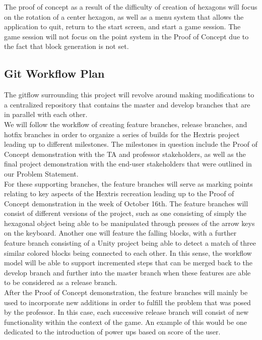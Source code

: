 \documentclass[12pt]{article}
\begin{document}
The proof of concept as a result of the difficulty of creation of hexagons will focus on the rotation of a center hexagon, as well as a menu system that allows the application to quit, return to the start screen, and start a game session. The game session will not focus on the point system in the Proof of Concept due to the fact that block generation is not set. 

\subsection{Git Workflow Plan}
The gitflow surrounding this project will revolve around making modifications to a centralized repository that contains the master and develop branches that are in parallel with each other.\\

We will follow the workflow of creating feature branches, release branches, and hotfix branches in order to organize a series of builds for the Hextris project leading up to different milestones. The milestones in question include the Proof of Concept demonstration with the TA and professor stakeholders, as well as the final project demonstration with the end-user stakeholders that were outlined in our Problem Statement. \\

For these supporting branches, the feature branches will serve as marking points relating to key aspects of the Hextris recreation leading up to the Proof of Concept demonstration in the week of October 16th. The feature branches will consist of different versions of the project, such as one consisting of simply the hexagonal object being able to be manipulated through presses of the arrow keys on the keyboard. Another one will feature the falling blocks, with a further feature branch consisting of a Unity project being able to detect a match of three similar colored blocks being connected to each other. In this sense, the workflow model will be able to support incremented steps that can be merged back to the develop branch and further into the master branch when these features are able to be considered as a release branch. \\

After the Proof of Concept demonstration, the feature branches will mainly be used to incorporate new additions in order to fulfill the problem that was posed by the professor. In this case, each successive release branch will consist of new functionality within the context of the game. An example of this would be one dedicated to the introduction of power ups based on score of the user.\\
\end{document}
